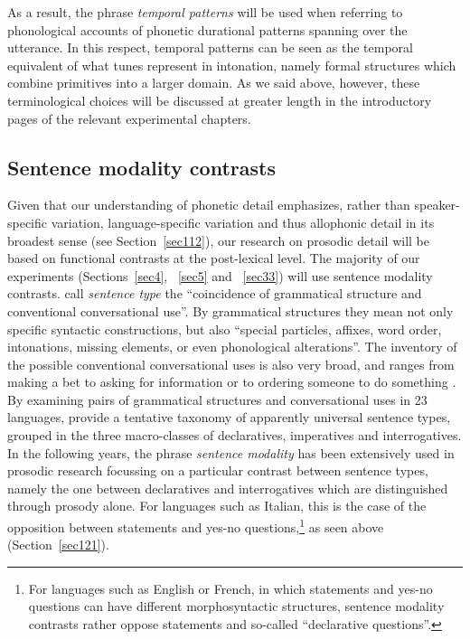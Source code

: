 As a result, the phrase \textit{temporal patterns} will be used when referring to phonological accounts of phonetic durational patterns spanning over the utterance. In this respect, temporal patterns can be seen as the temporal equivalent of what tunes represent in intonation, namely formal structures which combine primitives into a larger domain. As we said above, however, these terminological choices will be discussed at greater length in the introductory pages of the relevant experimental chapters.

\subsection{Sentence modality contrasts}\label{sec133}
Given that our understanding of phonetic detail emphasizes, rather than speaker-specific variation, language-specific variation and thus allophonic detail in its broadest sense (see Section~\ref{sec112}), our research on prosodic detail will be based on functional contrasts at the post-lexical level. The majority of our experiments (Sections~\ref{sec4}, ~\ref{sec5} and ~\ref{sec33}) will use sentence modality contrasts. \citet{sadock1985speech} call \textit{sentence type} the ``coincidence of grammatical structure and conventional conversational use''. By grammatical structures they mean not only specific syntactic constructions, but also ``special particles, affixes, word order, intonations, missing elements, or even phonological alterations''. The inventory of the possible conventional conversational uses is also very broad, and ranges from making a bet to asking for information or to ordering someone to do something \citep{lyons1977semantics}. By examining pairs of grammatical structures and conversational uses in 23 languages, \citet{sadock1985speech} provide a tentative taxonomy of apparently universal sentence types, grouped in the three macro-classes of declaratives, imperatives and interrogatives.  In the following years, the phrase \textit{sentence modality} has been extensively used in prosodic research focussing on a particular contrast between sentence types, namely the one between declaratives and interrogatives which are distinguished through prosody alone. For languages such as Italian, this is the case of the opposition between statements and yes-no questions,\footnote{For languages such as English or French, in which statements and yes-no questions can have different morphosyntactic structures, sentence modality contrasts rather oppose statements and so-called ``declarative questions''.} as seen above (Section~\ref{sec121}).

